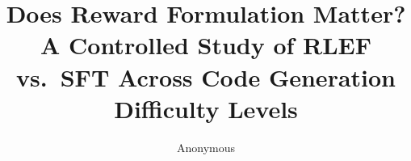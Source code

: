 \documentclass[11pt,a4paper]{article}
\title{Does Reward Formulation Matter?\\
A Controlled Study of RLEF vs.\ SFT Across Code Generation Difficulty Levels}
\author{Anonymous}
\date{}
\begin{document}
\maketitle

\begin{abstract}

\end{abstract}











\end{document}
